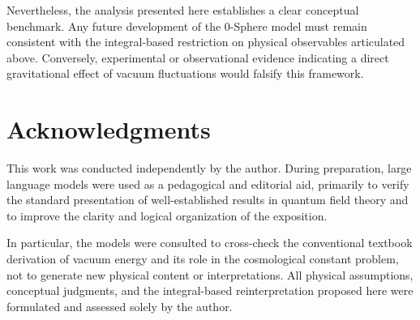 \documentclass[%
 reprint,
 amsmath,amssymb,
 aps,
 prb,
]{revtex4-2}
\numberwithin{equation}{section}
\begin{document}
Nevertheless, the analysis presented here establishes a clear conceptual benchmark. Any future development of the 0-Sphere model must remain consistent with the integral-based restriction on physical observables articulated above. Conversely, experimental or observational evidence indicating a direct gravitational effect of vacuum fluctuations would falsify this framework.


\section*{Acknowledgments}

This work was conducted independently by the author. During preparation, large language models were used as a pedagogical and editorial aid, primarily to verify the standard presentation of well-established results in quantum field theory and to improve the clarity and logical organization of the exposition. 

In particular, the models were consulted to cross-check the conventional textbook derivation of vacuum energy and its role in the cosmological constant problem, not 
to generate new physical content or interpretations. All physical assumptions, conceptual judgments, and the integral-based reinterpretation proposed here were formulated and assessed solely by the author.
\end{document}
